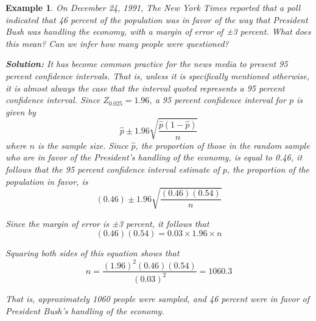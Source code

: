 \documentclass[12pt,a4paper]{article}
\theoremstyle{example}
\newtheorem{example}{Example}
\theoremstyle{definition}
\theoremstyle{theorem}
\begin{document}
 \begin{example}
     \citep{ross2017introductory}
     On December 24, 1991, The New York Times reported that a poll indicated that 46 percent of the population was in favor of the way that President Bush was handling the economy, with a margin of error of ±3 percent. What does this mean? Can we infer how many people were questioned?

\textbf{Solution:}
It has become common practice for the news media to present 95 percent confidence intervals. That is, unless it is specifically mentioned otherwise, it is almost always the case that the interval quoted represents a 95 percent confidence interval. Since \(Z_{0.025} = 1.96\), a 95 percent confidence interval for \(p\) is given by
\[
\hat{p} \pm 1.96 \sqrt{\frac{\hat{p}(1 - \hat{p})}{n}}
\]
where \(n\) is the sample size. Since \(\hat{p}\), the proportion of those in the random sample who are in favor of the President’s handling of the economy, is equal to 0.46, it follows that the 95 percent confidence interval estimate of \(p\), the proportion of the population in favor, is
\[
(0.46) \pm 1.96 \sqrt{\frac{(0.46)(0.54)}{n}}
\]

Since the margin of error is ±3 percent, it follows that
\[
(0.46)(0.54) = 0.03 \times 1.96 \times n
\]

Squaring both sides of this equation shows that
\[
n = \frac{(1.96)^2 (0.46)(0.54)}{(0.03)^2} = 1060.3
\]

That is, approximately 1060 people were sampled, and 46 percent were in favor of President Bush’s handling of the economy.

 \end{example}
\end{document}
